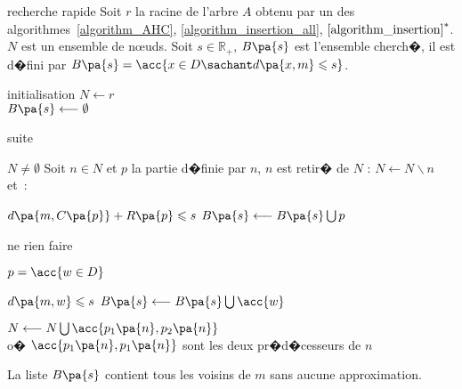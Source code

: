         \begin{xalgorithm}{recherche rapide}\label{algorithm_optimisation}%
        Soit $r$ la racine de l'arbre $A$ obtenu par un des algorithmes~\ref{algorithm_AHC},
        \ref{algorithm_insertion_all},
        $\ref{algorithm_insertion}^*$. $N$ est un ensemble de n\oe uds. Soit $s \in \mathbb{R}_+$, $B\pa{s}$ est 
        l'ensemble cherch�, il est d�fini par $B\pa{s} = \acc{ x \in D \sachant d\pa{x,m} \leqslant s }$.
        
        \begin{xalgostep}{initialisation}
            $N \longleftarrow r$ \\
            $B\pa{s} \longleftarrow \emptyset$
        \end{xalgostep}
        
        \begin{xalgostep}{suite}\label{space_algo_step_B}
            \begin{xwhile}{$N \neq \emptyset$}
                Soit $n \in N$ et $p$ la partie d�finie par $n$, $n$ est retir� de $N$ : 
                                            $N \longleftarrow N \backslash n$
                et~: \\
                \begin{xif}{$d\pa{m, C\pa{p}} + R\pa{p}\leqslant s $}
                    $B\pa{s} \longleftarrow B\pa{s} \bigcup p$
                    
                                ne rien faire
                \xelse
                    \begin{xif}{$p = \acc{ w \in D}$}
                            \begin{xif}{$d\pa{m, w} \leqslant s$}
                                $B\pa{s} \longleftarrow B\pa{s} \bigcup \acc{w}$
                            \end{xif}
                    \xelse
                        $N \longleftarrow N \bigcup \acc{p_1\pa{n},p_2\pa{n}}$\\
                        o� $\acc{p_1\pa{n},p_1\pa{n}}$ sont les deux pr�d�cesseurs de $n$
                    \end{xif}
                \end{xif}
            \end{xwhile}
        \end{xalgostep} 
        
        La liste $B\pa{s}$ contient tous les voisins de $m$ sans aucune approximation.
        \end{xalgorithm}


